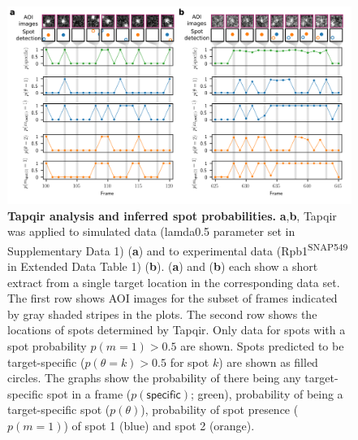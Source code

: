 \begin{figure}[h]
\centering
\includegraphics[width=\textwidth]{extended-data/figure2/figure2.png}
\caption{\textbf{Tapqir analysis and inferred spot probabilities.} \textbf{a},\textbf{b}, Tapqir was applied to simulated data (lamda0.5 parameter set in Supplementary Data 1) (\textbf{a}) and to experimental data (Rpb1\textsuperscript{SNAP549} in Extended Data Table 1) (\textbf{b}). (\textbf{a}) and (\textbf{b}) each show a short extract from a single target location in the corresponding data set. The first row shows AOI images for the subset of frames indicated by gray shaded stripes in the plots. The second row shows the locations of spots determined by Tapqir. Only data for spots with a spot probability $p(m=1) > 0.5$ are shown. Spots predicted to be target-specific ($p(\theta=k)>0.5$ for spot $k$) are shown as filled circles. The graphs show the probability of there being any target-specific spot in a frame ($p(\mathsf{specific})$; green), probability of being a target-specific spot ($p(\theta)$), probability of spot presence ($p(m=1)$) of spot 1 (blue) and spot 2 (orange).  }
\end{figure}
\pagebreak

